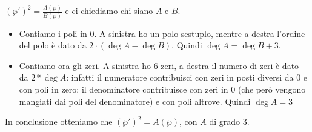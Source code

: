 $(\wp')^2=\frac{A(\wp)}{B(\wp)}$ e ci chiediamo chi siano $A$ e $B$.

\begin{itemize}
 \item Contiamo i poli in 0. A sinistra ho un polo sestuplo, mentre a destra l'ordine del polo è dato da $2\cdot (\deg A - \deg B)$. Quindi $\deg A = \deg B + 3$.
 \item Contiamo ora gli zeri. A sinistra ho 6 zeri, a destra il numero di zeri è dato da $2*\deg A$: infatti il numeratore contribuisci con zeri in posti diversi da 0 e con poli in zero; il denominatore contribuisce con zeri in 0 (che però vengono mangiati dai poli del denominatore) e con poli altrove. Quindi $\deg A = 3$
\end{itemize}

In conclusione otteniamo che $(\wp')^2=A(\wp)$, con $A$ di grado 3.














